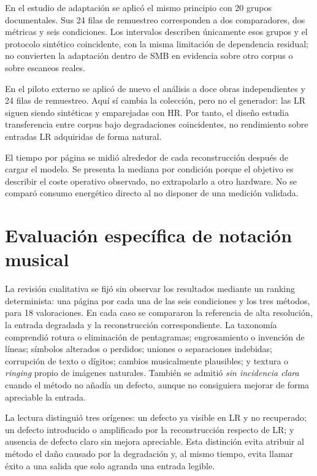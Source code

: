 En el estudio de adaptación se aplicó el mismo principio con 20 grupos documentales. Sus 24 filas
de remuestreo corresponden a dos comparadores, dos métricas y seis condiciones. Los intervalos
describen únicamente esos grupos y el protocolo sintético coincidente, con la misma limitación
de dependencia residual; no convierten la adaptación
dentro de SMB en evidencia sobre otro corpus o sobre escaneos reales.

En el piloto externo se aplicó de nuevo el análisis a doce obras independientes y 24 filas de
remuestreo. Aquí sí cambia la colección, pero no el generador: las LR siguen siendo sintéticas y
emparejadas con HR. Por tanto, el diseño estudia transferencia entre corpus bajo degradaciones
coincidentes, no rendimiento sobre entradas LR adquiridas de forma natural.

El tiempo por página se midió alrededor de cada reconstrucción después de cargar el modelo. Se
presenta la mediana por condición porque el objetivo es describir el coste operativo observado, no
extrapolarlo a otro hardware. No se comparó consumo energético directo al no disponer de una
medición validada.

\section{Evaluación específica de notación musical}
La revisión cualitativa se fijó sin observar los resultados mediante un ranking determinista: una
página por cada una de las seis condiciones y los tres métodos, para 18 valoraciones. En cada caso
se compararon la referencia de alta resolución, la entrada degradada y la reconstrucción
correspondiente. La taxonomía comprendió rotura o eliminación de pentagramas; engrosamiento o
invención de líneas; símbolos alterados o perdidos; uniones o separaciones indebidas; corrupción de
texto o dígitos; cambios musicalmente plausibles; y textura o \emph{ringing} propio de imágenes
naturales. También se admitió \emph{sin incidencia clara} cuando el método no añadía un defecto,
aunque no consiguiera mejorar de forma apreciable la entrada.

La lectura distinguió tres orígenes: un defecto ya visible en LR y no recuperado; un defecto
introducido o amplificado por la reconstrucción respecto de LR; y ausencia de defecto claro sin
mejora apreciable. Esta distinción evita atribuir al método el daño causado por la degradación y,
al mismo tiempo, evita llamar éxito a una salida que solo agranda una entrada legible.

